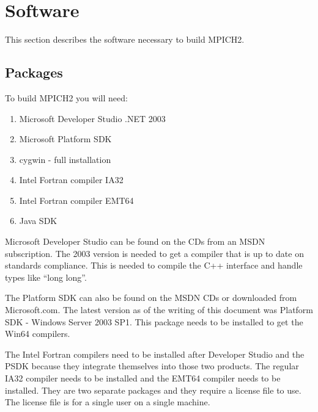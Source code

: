 \documentclass[dvipdfm,11pt]{article}
\begin{document}
\section{Software}

This section describes the software necessary to build MPICH2.

\subsection{Packages}
\label{sec:packages}

To build MPICH2 you will need:
\begin{enumerate}
\item Microsoft Developer Studio .NET 2003
\item Microsoft Platform SDK
\item cygwin - full installation
\item Intel Fortran compiler IA32
\item Intel Fortran compiler EMT64
\item Java SDK
\end{enumerate}

Microsoft Developer Studio can be found on the CDs from an MSDN subscription.  The
2003 version is needed to get a compiler that is up to date on standards compliance.  This
is needed to compile the C++ interface and handle types like ``long long''.

The Platform SDK can also be found on the MSDN CDs or downloaded from Microsoft.com.  The
latest version as of the writing of this document was Platform SDK - Windows Server 2003 SP1.
This package needs to be installed to get the Win64 compilers.

The Intel Fortran compilers need to be installed after Developer Studio and the PSDK because
they integrate themselves into those two products.  The regular IA32 compiler needs to be 
installed and the EMT64 compiler needs to be installed.  They are two separate packages and 
they require a license file to use.  The license file is for a single user on a single 
machine.

\end{document}
